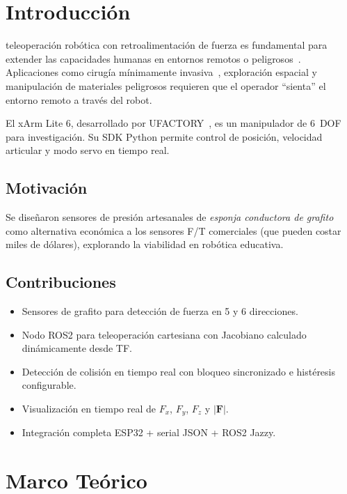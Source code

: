 \documentclass[journal,10pt,twoside]{IEEEtran}
\newcommand{\xarm}{xArm Lite 6}
\newcommand{\ros}{ROS2}
\begin{document}
\section{Introducción}

 teleoperación robótica con retroalimentación de
fuerza es fundamental para extender las capacidades humanas en
entornos remotos o peligrosos~\cite{murray1994}. Aplicaciones como
cirugía mínimamente invasiva~\cite{hogan1985}, exploración espacial
y manipulación de materiales peligrosos requieren que el operador
``sienta'' el entorno remoto a través del robot.

El \xarm{}, desarrollado por UFACTORY~\cite{xarm_github}, es un
manipulador de 6~DOF para investigación. Su SDK Python permite
control de posición, velocidad articular y modo servo en tiempo real.

\subsection{Motivación}
Se diseñaron sensores de presión artesanales de \emph{esponja
conductora de grafito} como alternativa económica a los sensores
F/T comerciales (que pueden costar miles de dólares), explorando
la viabilidad en robótica educativa.

\subsection{Contribuciones}
\begin{itemize}[leftmargin=1.2em,itemsep=1pt]
  \item Sensores de grafito para detección de fuerza en 5 y 6 direcciones.
  \item Nodo \ros{} para teleoperación cartesiana con Jacobiano
        calculado dinámicamente desde TF.
  \item Detección de colisión en tiempo real con bloqueo sincronizado
        e histéresis configurable.
  \item Visualización en tiempo real de $F_x$, $F_y$, $F_z$ y $|\bm{F}|$.
  \item Integración completa ESP32 + serial JSON + \ros{} Jazzy.
\end{itemize}

\section{Marco Teórico}
\end{document}
